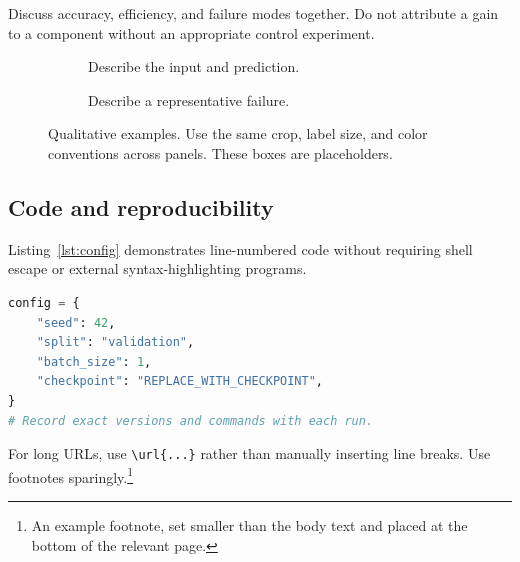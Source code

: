 Discuss accuracy, efficiency, and failure modes together. Do not attribute a
gain to a component without an appropriate control experiment.

\begin{figure}[ht]
\centering
\begin{subfigure}[t]{0.47\linewidth}
  \centering
  \caption{Describe the input and prediction.}\label{fig:case-a}
\end{subfigure}\hfill
\begin{subfigure}[t]{0.47\linewidth}
  \centering
  \caption{Describe a representative failure.}\label{fig:case-b}
\end{subfigure}
\caption{Qualitative examples. Use the same crop, label size, and color
conventions across panels. These boxes are placeholders.}\label{fig:cases}
\end{figure}

\subsection{Code and reproducibility}
Listing~\ref{lst:config} demonstrates line-numbered code without requiring
shell escape or external syntax-highlighting programs.
\begin{lstlisting}[language=Python,caption={Illustrative evaluation configuration.},label={lst:config}]
config = {
    "seed": 42,
    "split": "validation",
    "batch_size": 1,
    "checkpoint": "REPLACE_WITH_CHECKPOINT",
}
# Record exact versions and commands with each run.
\end{lstlisting}
For long URLs, use \verb|\url{...}| rather than manually inserting line breaks.
Use footnotes sparingly.\footnote{An example footnote, set smaller than the
body text and placed at the bottom of the relevant page.}
